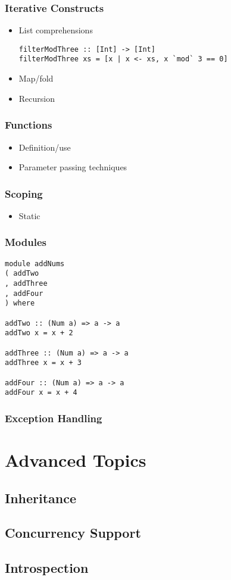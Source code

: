 \documentclass[titlepage,12pt]{article}
\newcommand{\bi}{\begin{itemize}}
\newcommand{\ei}{\end{itemize}}
\begin{document}
\subsubsection{Iterative Constructs}
\bi
    \item List comprehensions
\begin{verbatim}
filterModThree :: [Int] -> [Int]
filterModThree xs = [x | x <- xs, x `mod` 3 == 0]
\end{verbatim}
    \item Map/fold
    \item Recursion
\ei

\subsubsection{Functions}
\bi
    \item Definition/use
    \item Parameter passing techniques
\ei

\subsubsection{Scoping}
\bi
    \item Static
\ei

\subsubsection{Modules}
\begin{verbatim}
module addNums
( addTwo
, addThree
, addFour
) where

addTwo :: (Num a) => a -> a
addTwo x = x + 2

addThree :: (Num a) => a -> a
addThree x = x + 3

addFour :: (Num a) => a -> a
addFour x = x + 4
\end{verbatim}
\subsubsection{Exception Handling}


\section{Advanced Topics}

\subsection{Inheritance}
\subsection{Concurrency Support}
\subsection{Introspection}



\end{document}
